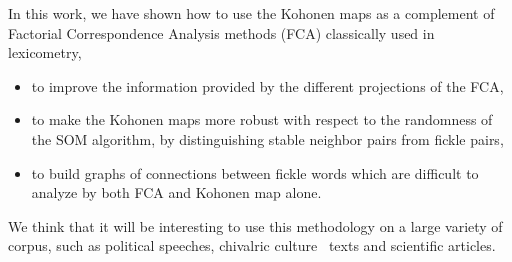 \documentclass[preprint]{elsarticle}
\begin{document}
In this work, we have shown how to use the Kohonen maps as a complement of Factorial Correspondence  Analysis  methods (FCA) classically used in lexicometry,

\begin{itemize}
\item to improve the information provided by the different projections of the FCA,

\item to make the Kohonen maps more robust with respect to the randomness of the SOM  algorithm, by distinguishing stable neighbor pairs from fickle pairs,

\item to build graphs of connections between fickle words which are difficult to analyze by both FCA and Kohonen map alone.
\end{itemize}

We think that it will be interesting to use this methodology on a large variety of corpus, such as political speeches, chivalric culture~\cite{Der2010} texts and scientific articles. 



\end{document}
